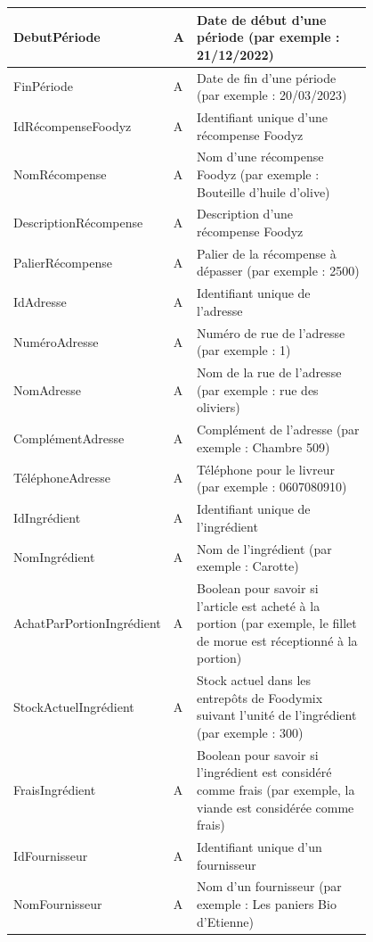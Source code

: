 \documentclass{article}
\begin{document}
\begin{center}
\begin{longtable}{|p{0.25\linewidth}|p{0.05\linewidth}|p{0.50\linewidth}|}
        \hline 
        DebutPériode & A & Date de début d'une période (par exemple : 21/12/2022) \\
        \hline 
        FinPériode & A & Date de fin d'une période (par exemple : 20/03/2023) \\
        \hline 
        IdRécompenseFoodyz & A & Identifiant unique d'une récompense Foodyz  \\
        \hline 
        NomRécompense & A & Nom d'une récompense Foodyz (par exemple : Bouteille d'huile d'olive) \\
        \hline 
        DescriptionRécompense & A & Description d'une récompense Foodyz \\
        \hline 
        PalierRécompense & A & Palier de la récompense à dépasser (par exemple : 2500) \\
        \hline 
        IdAdresse & A & Identifiant unique de l'adresse \\
        \hline 
        NuméroAdresse & A & Numéro de rue de l'adresse (par exemple : 1) \\
        \hline 
        NomAdresse & A & Nom de la rue de l'adresse (par exemple : rue des oliviers) \\
        \hline 
        ComplémentAdresse & A & Complément de l'adresse (par exemple : Chambre 509) \\
        \hline 
        TéléphoneAdresse & A & Téléphone pour le livreur (par exemple : 0607080910) \\
        \hline 
        IdIngrédient & A & Identifiant unique de l'ingrédient \\
        \hline 
        NomIngrédient & A & Nom de l'ingrédient (par exemple : Carotte) \\
        \hline 
        AchatParPortionIngrédient & A & Boolean pour savoir si l'article est acheté à la portion (par exemple, le fillet de morue est réceptionné à la portion) \\
        \hline 
        StockActuelIngrédient & A & Stock actuel dans les entrepôts de Foodymix suivant l'unité de l'ingrédient (par exemple : 300) \\
        \hline 
        FraisIngrédient & A & Boolean pour savoir si l'ingrédient est considéré comme frais (par exemple, la viande est considérée comme frais) \\
        \hline 
        IdFournisseur & A & Identifiant unique d'un fournisseur \\
        \hline 
        NomFournisseur & A & Nom d'un fournisseur (par exemple : Les paniers Bio d'Etienne) \\

\end{longtable}
\end{center}
\end{document}

